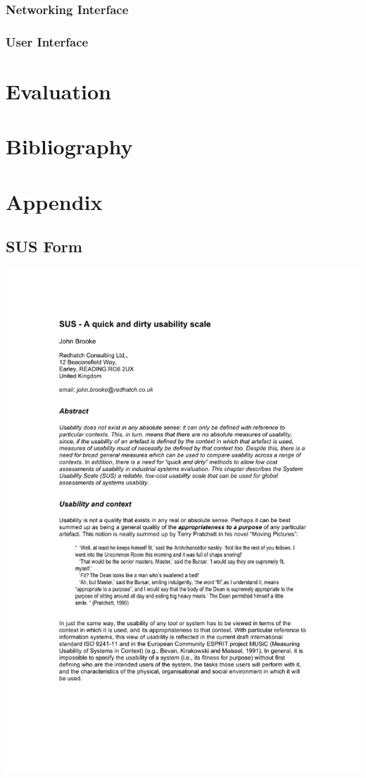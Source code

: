\documentclass{article}
\begin{document}
\subsubsection{Networking Interface}

\subsubsection{User Interface}

\section{Evaluation}
	\newpage
	\section{Bibliography}
	\printbibliography
	\newpage
	\section{Appendix}
	\subsection{SUS Form}
	\centering
	\includegraphics[page=6]{sus.pdf} 
\end{document}
